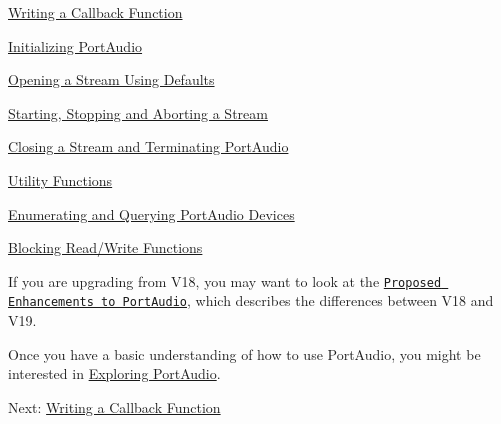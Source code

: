 \begin{DoxyItemize}
\item \hyperlink{writing_a_callback}{Writing a Callback Function}
\item \hyperlink{initializing_portaudio}{Initializing Port\+Audio}
\item \hyperlink{open_default_stream}{Opening a Stream Using Defaults}
\item \hyperlink{start_stop_abort}{Starting, Stopping and Aborting a Stream}
\item \hyperlink{terminating_portaudio}{Closing a Stream and Terminating Port\+Audio}
\item \hyperlink{utility_functions}{Utility Functions}
\item \hyperlink{querying_devices}{Enumerating and Querying Port\+Audio Devices}
\item \hyperlink{blocking_read_write}{Blocking Read/\+Write Functions}
\end{DoxyItemize}

If you are upgrading from V18, you may want to look at the \href{http://www.portaudio.com/docs/proposals/index.html}{\tt Proposed Enhancements to Port\+Audio}, which describes the differences between V18 and V19.

Once you have a basic understanding of how to use Port\+Audio, you might be interested in \hyperlink{exploring}{Exploring Port\+Audio}.

Next\+: \hyperlink{writing_a_callback}{Writing a Callback Function} 